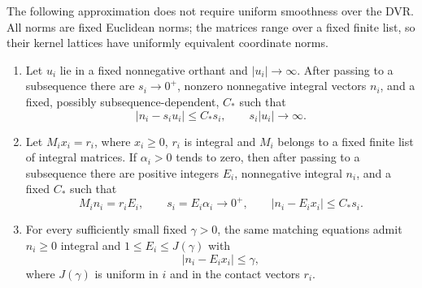 The following approximation does not require uniform smoothness over the
DVR.  All norms are fixed Euclidean norms; the matrices range over a
fixed finite list, so their kernel lattices have uniformly equivalent
coordinate norms.

\begin{lemma}\label{lem:A-lattice-approximation}
\begin{enumerate}[label=\textup{(\roman*)}]
\item
Let \(u_i\) lie in a fixed nonnegative orthant and
\(\lvert u_i\rvert\to\infty\).  After passing to a subsequence there
are \(s_i\to0^+\), nonzero nonnegative integral vectors \(n_i\), and
a fixed, possibly subsequence-dependent, \(C_*\) such that
\begin{equation}\label{eq:A-horizontal-approximation}
 \lvert n_i-s_i u_i\rvert\le C_*s_i,
 \qquad s_i\lvert u_i\rvert\longrightarrow\infty .
\end{equation}
\item
Let \(M_i x_i=r_i\), where \(x_i\ge0\), \(r_i\) is integral and
\(M_i\) belongs to a fixed finite list of integral matrices.
If \(\alpha_i>0\) tends to zero, then after passing to a subsequence
there are positive integers \(E_i\), nonnegative integral \(n_i\), and
a fixed \(C_*\) such that
\begin{equation}\label{eq:A-vertical-approximation}
 M_i n_i=r_i E_i,\qquad
 s_i=E_i\alpha_i\longrightarrow0^+,\qquad
 \lvert n_i-E_i x_i\rvert\le C_*s_i .
\end{equation}
\item
For every sufficiently small fixed \(\gamma>0\), the same matching
equations admit \(n_i\ge0\) integral and \(1\le E_i\le J(\gamma)\)
with
\begin{equation}\label{eq:A-bounded-dirichlet}
 \lvert n_i-E_i x_i\rvert\le\gamma ,
\end{equation}
where \(J(\gamma)\) is uniform in \(i\) and in the contact vectors
\(r_i\).
\end{enumerate}
\end{lemma}

